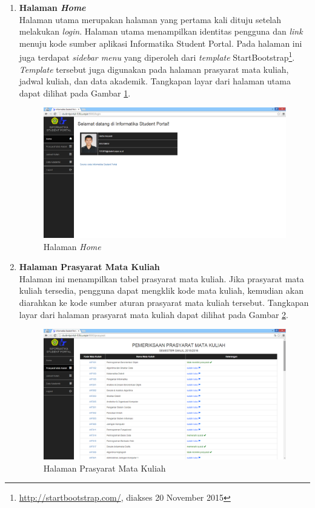 \begin{enumerate}
				\item\textbf{Halaman \textit{Home}}\\
				Halaman utama merupakan halaman yang pertama kali dituju setelah melakukan \textit{login}. Halaman utama menampilkan identitas pengguna dan \textit{link} menuju kode sumber aplikasi Informatika Student Portal. Pada halaman ini juga terdapat \textit{sidebar menu} yang diperoleh dari \textit{template} StartBootstrap\footnote{\url{http://startbootstrap.com/}, diakses 20 November 2015}. \textit{Template} tersebut juga digunakan pada halaman prasyarat mata kuliah, jadwal kuliah, dan data akademik. Tangkapan layar dari halaman utama dapat dilihat pada Gambar \ref{fig:5_hasil_utama}.
					\begin{figure}[H]
						\centering
						\includegraphics[scale=0.34]{Gambar/hasil_home}
						\caption{Halaman \textit{Home}} 
						\label{fig:5_hasil_utama}
					\end{figure}
						
				\item\textbf{Halaman Prasyarat Mata Kuliah}\\
				Halaman ini menampilkan tabel prasyarat mata kuliah. Jika prasyarat mata kuliah tersedia, pengguna dapat mengklik kode mata kuliah, kemudian akan diarahkan ke kode sumber aturan prasyarat mata kuliah tersebut. Tangkapan layar dari halaman prasyarat mata kuliah dapat dilihat pada Gambar \ref{fig:5_hasil_prasyarat}.
					\begin{figure}[H]
						\centering
						\includegraphics[scale=0.34]{Gambar/hasil_prasyarat}
						\caption{Halaman Prasyarat Mata Kuliah} 
						\label{fig:5_hasil_prasyarat}
					\end{figure}


\end{enumerate}
